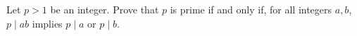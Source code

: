 Let $p>1$ be an integer. Prove that $p$ is prime if and only if, for all integers $a,b$, $p\mid ab$ implies $p\mid a$ or $p\mid b$.
